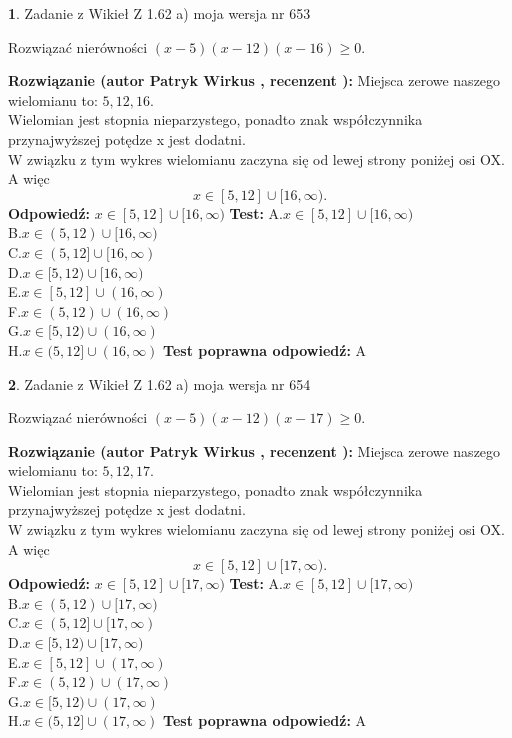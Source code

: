 \documentclass[12pt, a4paper]{article}
\theoremstyle{definition} %
\newtheorem{zad}{}
\newcommand{\zadStart}[1]{\begin{zad}#1\newline}
\newcommand{\zadStop}{\end{zad}}
\newcommand{\rozwStart}[2]{\noindent \textbf{Rozwiązanie (autor #1 , recenzent #2): }\newline}
\newcommand{\rozwStop}{\newline}
\newcommand{\odpStart}{\noindent \textbf{Odpowiedź:}\newline}
\newcommand{\odpStop}{\newline}
\newcommand{\testStart}{\noindent \textbf{Test:}\newline}
\newcommand{\testStop}{\newline}
\newcommand{\kluczStart}{\noindent \textbf{Test poprawna odpowiedź:}\newline}
\newcommand{\kluczStop}{\newline}
\begin{document}
\zadStart{Zadanie z Wikieł Z 1.62 a) moja wersja nr 653}

Rozwiązać nierówności $(x-5)(x-12)(x-16)\ge0$.
\zadStop
\rozwStart{Patryk Wirkus}{}
Miejsca zerowe naszego wielomianu to: $5, 12, 16$.\\
Wielomian jest stopnia nieparzystego, ponadto znak współczynnika przy\linebreak najwyższej potędze x jest dodatni.\\ W związku z tym wykres wielomianu zaczyna się od lewej strony poniżej osi OX. A więc $$x \in [5,12] \cup [16,\infty).$$
\rozwStop
\odpStart
$x \in [5,12] \cup [16,\infty)$
\odpStop
\testStart
A.$x \in [5,12] \cup [16,\infty)$\\
B.$x \in (5,12) \cup [16,\infty)$\\
C.$x \in (5,12] \cup [16,\infty)$\\
D.$x \in [5,12) \cup [16,\infty)$\\
E.$x \in [5,12] \cup (16,\infty)$\\
F.$x \in (5,12) \cup (16,\infty)$\\
G.$x \in [5,12) \cup (16,\infty)$\\
H.$x \in (5,12] \cup (16,\infty)$
\testStop
\kluczStart
A
\kluczStop



\zadStart{Zadanie z Wikieł Z 1.62 a) moja wersja nr 654}

Rozwiązać nierówności $(x-5)(x-12)(x-17)\ge0$.
\zadStop
\rozwStart{Patryk Wirkus}{}
Miejsca zerowe naszego wielomianu to: $5, 12, 17$.\\
Wielomian jest stopnia nieparzystego, ponadto znak współczynnika przy\linebreak najwyższej potędze x jest dodatni.\\ W związku z tym wykres wielomianu zaczyna się od lewej strony poniżej osi OX. A więc $$x \in [5,12] \cup [17,\infty).$$
\rozwStop
\odpStart
$x \in [5,12] \cup [17,\infty)$
\odpStop
\testStart
A.$x \in [5,12] \cup [17,\infty)$\\
B.$x \in (5,12) \cup [17,\infty)$\\
C.$x \in (5,12] \cup [17,\infty)$\\
D.$x \in [5,12) \cup [17,\infty)$\\
E.$x \in [5,12] \cup (17,\infty)$\\
F.$x \in (5,12) \cup (17,\infty)$\\
G.$x \in [5,12) \cup (17,\infty)$\\
H.$x \in (5,12] \cup (17,\infty)$
\testStop
\kluczStart
A
\kluczStop
\end{document}
